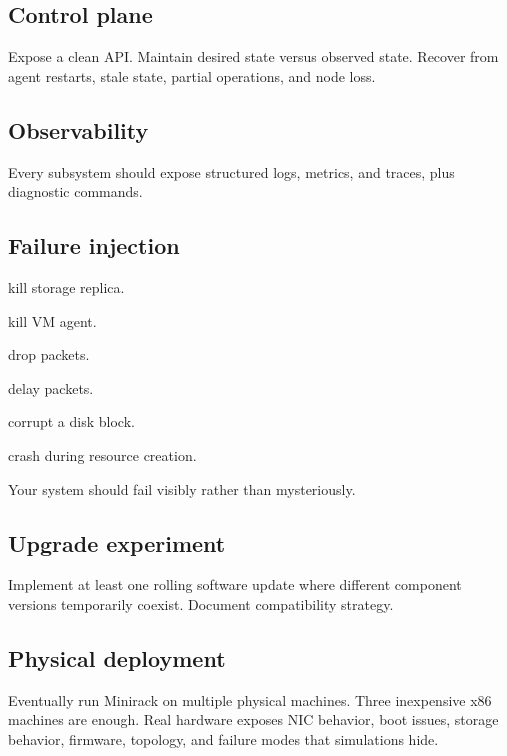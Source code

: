 \documentclass[11pt,letterpaper]{article}
\begin{document}
\subsection*{Control plane}

Expose a clean API. Maintain desired state versus observed state. Recover from agent restarts, stale state, partial operations, and node loss.

\subsection*{Observability}

Every subsystem should expose structured logs, metrics, and traces, plus diagnostic commands.

\subsection*{Failure injection}

\begin{topics}

\item kill storage replica.

\item kill VM agent.

\item drop packets.

\item delay packets.

\item corrupt a disk block.

\item crash during resource creation.

\end{topics}

Your system should fail visibly rather than mysteriously.

\subsection*{Upgrade experiment}

Implement at least one rolling software update where different component versions temporarily coexist. Document compatibility strategy.

\subsection*{Physical deployment}

Eventually run Minirack on multiple physical machines. Three inexpensive x86 machines are enough. Real hardware exposes NIC behavior, boot issues, storage behavior, firmware, topology, and failure modes that simulations hide.
\end{document}
